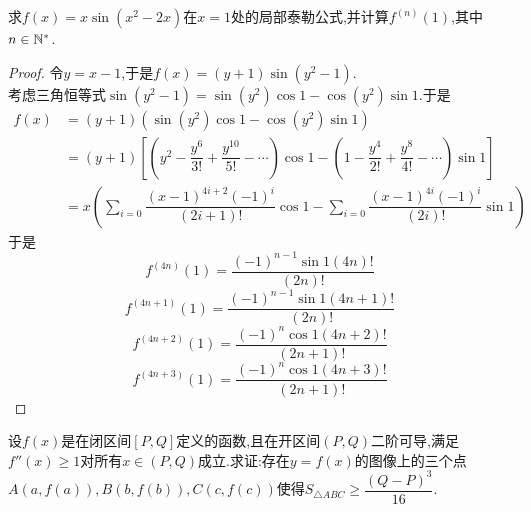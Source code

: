 \documentclass{ctexart}
\begin{document}
\begin{problem}[7.(12\songti{分})]
    求$f(x)=x\sin(x^2-2x)$在$x=1$处的局部泰勒公式,并计算$f^{(n)}(1)$,其中$n\in\mathbb{N}^*$.
\end{problem}
\begin{proof}
    令$y=x-1$,于是$f(x)=(y+1)\sin(y^2-1)$.\\
    考虑三角恒等式$\sin(y^2-1)=\sin(y^2)\cos1-\cos(y^2)\sin1$.于是
    \[\begin{aligned}
        f(x)
        &= (y+1)(\sin (y^2)\cos1-\cos (y^2)\sin1) \\
        &= (y+1)\left[\left(y^2-\dfrac{y^6}{3!}+\dfrac{y^{10}}{5!}-\cdots\right)\cos1-\left(1-\dfrac{y^4}{2!}+\dfrac{y^8}{4!}-\cdots\right)\sin1\right] \\
        &= x\left(\sum_{i=0}\dfrac{(x-1)^{4i+2}(-1)^i}{(2i+1)!}\cos1-\sum_{i=0}\dfrac{(x-1)^{4i}(-1)^i}{(2i)!}\sin 1\right)
    \end{aligned}\]
    于是\[f^{(4n)}(1)=\dfrac{(-1)^{n-1}\sin1(4n)!}{(2n)!}\]
    \[f^{(4n+1)}(1)=\dfrac{(-1)^{n-1}\sin1(4n+1)!}{(2n)!}\]
    \[f^{(4n+2)}(1)=\dfrac{(-1)^n\cos1(4n+2)!}{(2n+1)!}\]
    \[f^{(4n+3)}(1)=\dfrac{(-1)^n\cos1(4n+3)!}{(2n+1)!}\]
\end{proof}
\begin{problem}[8.(10\songti{分})]
    设$f(x)$是在闭区间$[P,Q]$定义的函数,且在开区间$(P,Q)$二阶可导,满足$f''(x)\geqslant1$对所有$x\in(P,Q)$成立.求证:存在$y=f(x)$的图像上的三个点%
    $A(a,f(a)),B(b,f(b)),C(c,f(c))$使得$S_{\triangle ABC}\geqslant\dfrac{(Q-P)^3}{16}$.
\end{problem}
\end{document}
